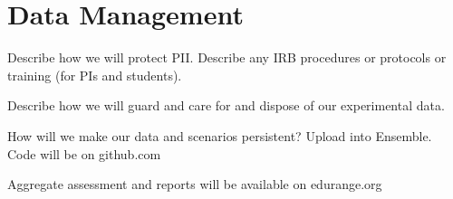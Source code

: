 \section*{Data Management}

Describe how we will protect PII. Describe any IRB procedures or
protocols or training (for PIs and students).

Describe how we will guard and care for and dispose of our
experimental data.

How will we make our data and scenarios persistent? Upload into
Ensemble.
Code will be on github.com

Aggregate assessment and reports will be available on edurange.org


